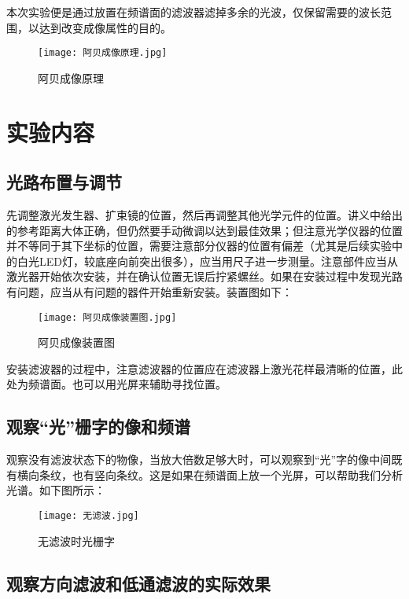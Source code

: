 \documentclass[11pt]{article}
\begin{document}
本次实验便是通过放置在频谱面的滤波器滤掉多余的光波，仅保留需要的波长范围，以达到改变成像属性的目的。

\begin{figure}[H]
    \centering
    \texttt{[image: 阿贝成像原理.jpg]}
    \caption{阿贝成像原理}
\end{figure}

\section{实验内容}

\subsection{光路布置与调节}

先调整激光发生器、扩束镜的位置，然后再调整其他光学元件的位置。讲义中给出的参考距离大体正确，但仍然要手动微调以达到最佳效果；但注意光学仪器的位置并不等同于其下坐标的位置，需要注意部分仪器的位置有偏差（尤其是后续实验中的白光LED灯，较底座向前突出很多），应当用尺子进一步测量。注意部件应当从激光器开始依次安装，并在确认位置无误后拧紧螺丝。如果在安装过程中发现光路有问题，应当从有问题的器件开始重新安装。装置图如下：

\begin{figure}[H]
    \centering
    \texttt{[image: 阿贝成像装置图.jpg]}
    \caption{阿贝成像装置图}
\end{figure}

安装滤波器的过程中，注意滤波器的位置应在滤波器上激光花样最清晰的位置，此处为频谱面。也可以用光屏来辅助寻找位置。

\subsection{观察“光”栅字的像和频谱}

观察没有滤波状态下的物像，当放大倍数足够大时，可以观察到“光”字的像中间既有横向条纹，也有竖向条纹。这是如果在频谱面上放一个光屏，可以帮助我们分析光谱。如下图所示：

\begin{figure}[H]
    \centering
    \texttt{[image: 无滤波.jpg]}
    \caption{无滤波时光栅字}
\end{figure}

\subsection{观察方向滤波和低通滤波的实际效果}
\end{document}
